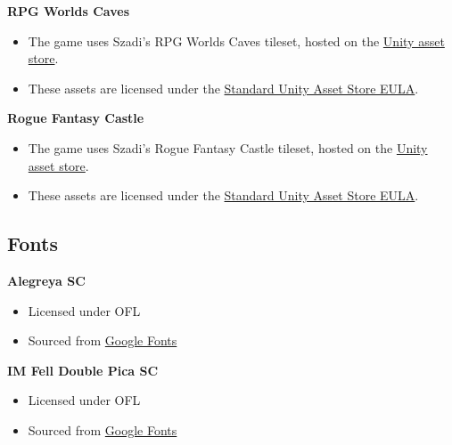 \documentclass[10pt]{article}
\begin{document}
\textbf{RPG Worlds Caves}
\begin{itemize}
    \item The game uses Szadi's RPG Worlds Caves tileset, hosted on the \href{https://assetstore.unity.com/packages/2d/environments/rpg-worlds-caves-167274}{Unity asset store}.
    \item These assets are licensed under the \href{https://unity3d.com/legal/as_terms}{Standard Unity Asset Store EULA}.
\end{itemize}

\textbf{Rogue Fantasy Castle}
\begin{itemize}
    \item The game uses Szadi's Rogue Fantasy Castle tileset, hosted on the \href{https://assetstore.unity.com/packages/2d/environments/rogue-fantasy-castle-164725}{Unity asset store}.
    \item These assets are licensed under the \href{https://unity3d.com/legal/as_terms}{Standard Unity Asset Store EULA}.
\end{itemize}

\subsection{Fonts}

\textbf{Alegreya SC}
\begin{itemize}
    \item Licensed under OFL
    \item Sourced from \href{https://fonts.google.com/specimen/Alegreya+SC}{Google Fonts}
\end{itemize}

\textbf{IM Fell Double Pica SC}
\begin{itemize}
    \item Licensed under OFL
    \item Sourced from \href{https://fonts.google.com/specimen/IM+Fell+Double+Pica+SC}{Google Fonts}
\end{itemize}





\end{document}
